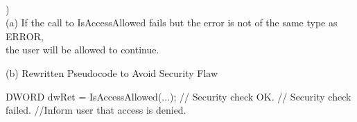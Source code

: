 \documentclass[12pt]{article}
\begin{document}
\noindent \hrulefill \\
\pagebreak

)\\
\indent (a) If the call to IsAccessAllowed fails but the error is not of the same type as ERROR,\\
\indent the user will be allowed to continue.\\


\renewcommand{\thealgorithm}{}
\begin{algorithm}[H]
\caption{(b) Rewritten Pseudocode to Avoid Security Flaw}
\begin{algorithmic} []
\State 
\State 
\State DWORD dwRet = IsAccessAllowed(...);
\State 
{}
\State // Security check OK.
\Else
\State // Security check failed.
\State //Inform user that access is denied.
\EndIf
\State 
\end{algorithmic}
\end{algorithm}
\end{document}
